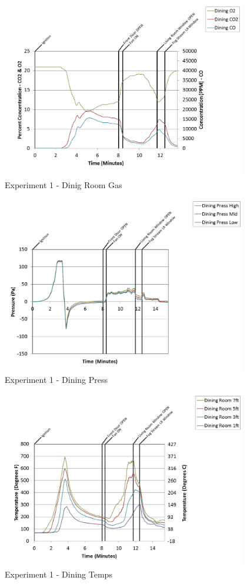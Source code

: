 \documentclass{article}
\begin{document}
\begin{appendices}
\clearpage

\begin{figure}[h!]
	\centering
	\includegraphics[height=3.05in]{0_Images/Results_Charts/Exp_1_Charts/DinigRoomGas.png}
	\caption{Experiment 1 - Dinig Room Gas}
\end{figure}


\begin{figure}[h!]
	\centering
	\includegraphics[height=3.05in]{0_Images/Results_Charts/Exp_1_Charts/DiningPress.png}
	\caption{Experiment 1 - Dining Press}
\end{figure}

\clearpage

\begin{figure}[h!]
	\centering
	\includegraphics[height=3.05in]{0_Images/Results_Charts/Exp_1_Charts/DiningTemps.png}
	\caption{Experiment 1 - Dining Temps}
\end{figure}



\end{appendices}
\end{document}
